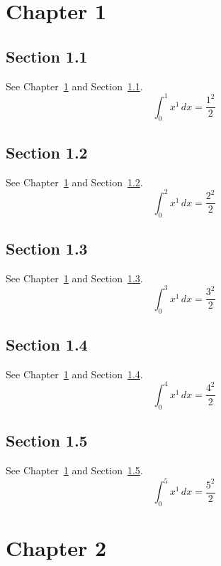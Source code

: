 \documentclass{book}
\begin{document}
\tableofcontents
\chapter{Chapter 1}\label{ch:1}
\section{Section 1.1}\label{sec:1-1}
See Chapter~\ref{ch:1} and Section~\ref{sec:1-1}.
\lipsum[7-9]
\begin{equation}\label{eq:1-1} \int_0^{1} x^{1}\,dx = \frac{1^{2}}{2}\end{equation}
\section{Section 1.2}\label{sec:1-2}
See Chapter~\ref{ch:1} and Section~\ref{sec:1-2}.
\lipsum[8-10]
\begin{equation}\label{eq:1-2} \int_0^{2} x^{1}\,dx = \frac{2^{2}}{2}\end{equation}
\section{Section 1.3}\label{sec:1-3}
See Chapter~\ref{ch:1} and Section~\ref{sec:1-3}.
\lipsum[9-11]
\begin{equation}\label{eq:1-3} \int_0^{3} x^{1}\,dx = \frac{3^{2}}{2}\end{equation}
\section{Section 1.4}\label{sec:1-4}
See Chapter~\ref{ch:1} and Section~\ref{sec:1-4}.
\lipsum[10-12]
\begin{equation}\label{eq:1-4} \int_0^{4} x^{1}\,dx = \frac{4^{2}}{2}\end{equation}
\section{Section 1.5}\label{sec:1-5}
See Chapter~\ref{ch:1} and Section~\ref{sec:1-5}.
\lipsum[11-13]
\begin{equation}\label{eq:1-5} \int_0^{5} x^{1}\,dx = \frac{5^{2}}{2}\end{equation}
\chapter{Chapter 2}\label{ch:2}
\end{document}

